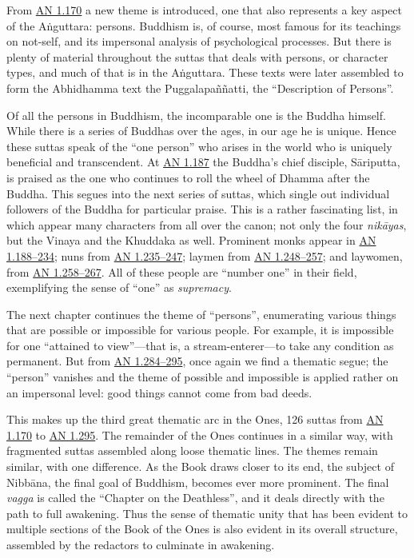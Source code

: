 \documentclass[12pt,openany]{book}%
\begin{document}
From \href{https://suttacentral.net/an1.170{-}187}{AN 1.170} a new theme is introduced, one that also represents a key aspect of the \textsanskrit{Aṅguttara}: persons. Buddhism is, of course, most famous for its teachings on not-self, and its impersonal analysis of psychological processes. But there is plenty of material throughout the suttas that deals with persons, or character types, and much of that is in the \textsanskrit{Aṅguttara}. These texts were later assembled to form the Abhidhamma text the \textsanskrit{Puggalapaññatti}, the “Description of Persons”.

Of all the persons in Buddhism, the incomparable one is the Buddha himself. While there is a series of Buddhas over the ages, in our age he is unique. Hence these suttas speak of the “one person” who arises in the world who is uniquely beneficial and transcendent. At \href{https://suttacentral.net/an1.170{-}187}{AN 1.187} the Buddha’s chief disciple, \textsanskrit{Sāriputta}, is praised as the one who continues to roll the wheel of Dhamma after the Buddha. This segues into the next series of suttas, which single out individual followers of the Buddha for particular praise. This is a rather fascinating list, in which appear many characters from all over the canon; not only the four \textit{\textsanskrit{nikāyas}}, but the Vinaya and the Khuddaka as well. Prominent monks appear in \href{https://suttacentral.net/an1.188{-}197}{AN 1.188–234}; nuns from \href{https://suttacentral.net/an1.235{-}247}{AN 1.235–247}; laymen from \href{https://suttacentral.net/an1.248{-}257}{AN 1.248–257}; and laywomen, from \href{https://suttacentral.net/an1.258{-}267}{AN 1.258–267}. All of these people are “number one” in their field, exemplifying the sense of “one” as \emph{supremacy}.

The next chapter continues the theme of “persons”, enumerating various things that are possible or impossible for various people. For example, it is impossible for one “attained to view”—that is, a stream-enterer—to take any condition as permanent. But from \href{https://suttacentral.net/an1.278{-}286}{AN 1.284–295}, once again we find a thematic segue; the “person” vanishes and the theme of possible and impossible is applied rather on an impersonal level: good things cannot come from bad deeds.

This makes up the third great thematic arc in the Ones, 126 suttas from \href{https://suttacentral.net/an1.170{-}187}{AN 1.170} to \href{https://suttacentral.net/an1.287{-}295}{AN 1.295}. The remainder of the Ones continues in a similar way, with fragmented suttas assembled along loose thematic lines. The themes remain similar, with one difference. As the Book draws closer to its end, the subject of \textsanskrit{Nibbāna}, the final goal of Buddhism, becomes ever more prominent. The final \textit{vagga} is called the “Chapter on the Deathless”, and it deals directly with the path to full awakening. Thus the sense of thematic unity that has been evident to multiple sections of the Book of the Ones is also evident in its overall structure, assembled by the redactors to culminate in awakening.
\end{document}

